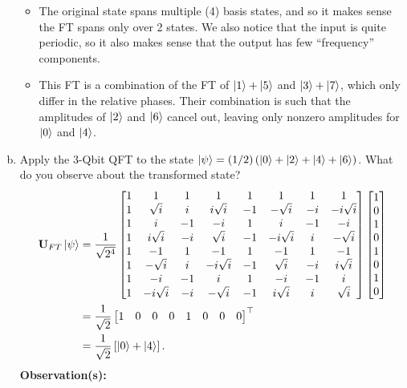 \documentclass{book}
\theoremstyle{definition}
\newcommand{\nn}{\nonumber}
\newcommand{\f}[2]{\frac{#1}{#2}}
\newcommand{\lp}{\left(}
\newcommand{\rp}{\right)}
\newcommand{\lb}{\left[}
\newcommand{\rb}{\right]}
\newcommand{\lc}{\left\{}
\newcommand{\rc}{\right\}}
\newcommand{\U}{\mathbf{U}}
\begin{document}
\begin{enumerate}[(a)]
	\begin{itemize}
		\item The original state spans multiple (4) basis states, and so it makes sense the FT spans only over 2 states. We also notice that the input is quite periodic, so it also makes sense that the output has few ``frequency'' components. 
		
		\item This FT is a combination of the FT of $\ket{1} + \ket{5}$ and $\ket{3} + \ket{7}$, which only differ in the relative phases. Their combination is such that the amplitudes of $\ket{2}$ and $\ket{6}$ cancel out, leaving only nonzero amplitudes for $\ket{0}$ and $\ket{4}$.
	\end{itemize}
	
	\newpage
	
	
	
	\item Apply the 3-Qbit QFT to the state $\ket{\psi} = (1/{2})\lp \ket{0} + \ket{2} + \ket{4} + \ket{6} \rp$. What do you observe about the transformed state?
	\begin{align}
	\U_{FT}\ket{\psi} &= \f{1}{\sqrt{2^4}}\begin{bmatrix}
	1 & 1 & 1 & 1 & 1 & 1 & 1 & 1\\
	1 &\sqrt{i}&i&i\sqrt{i}&-1&-\sqrt{i}&-i&-i\sqrt{i}\\
	1&i&-1&-i&1&i&-1&-i\\
	1&i\sqrt{i}&-i&\sqrt{i}&-1&-i\sqrt{i}&i&-\sqrt{i}\\
	1 & -1 & 1 & -1 & 1 & -1 & 1 & -1\\
	1&-\sqrt{i}&i&-i\sqrt{i}&-1&\sqrt{i}&-i&i\sqrt{i}\\
	1&-i&-1&i&1&-i&-1&i\\
	1&-i\sqrt{i}&-i&-\sqrt{i}&-1&i\sqrt{i}&i&\sqrt{i}
	\end{bmatrix}
	\begin{bmatrix}
	1\\0\\1\\0\\1\\0\\1\\0
	\end{bmatrix}\nn\\
	&= \f{1}{\sqrt{2}}\begin{bmatrix}
	1&0&0&0&1&0&0&0
	\end{bmatrix}^\top\nn\\
	&= \f{1}{\sqrt{2}}\lb \ket{0} + \ket{4} \rb.
	\end{align}
	\textbf{Observation(s):}
	

\end{enumerate}
\end{document}
